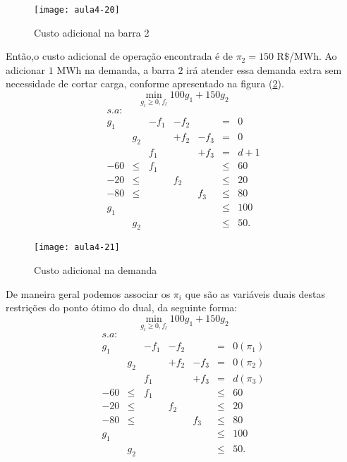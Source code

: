 \begin{figure}[H]
\begin{centering}
\texttt{[image: aula4-20]}\protect\caption{\label{fig:aula4-20} Custo adicional na barra 2}
\end{centering}
\end{figure}

Então,o custo adicional de operação encontrada é de  $\pi_{2}=150$ R$\$$/MWh.
Ao adicionar $1$ MWh na demanda, a barra $2$ irá atender essa demanda extra sem necessidade de cortar carga, conforme apresentado na figura (\ref{fig:aula4-21}).
\[
\min_{g_{i}\geq0,f_{l}}100g_{1}+150g_{2}
\]
\[
\begin{array}{ccccccc}
s.a:\\
g_{1} &  & -f_{1} & -f_{2} &  & = & 0\\
 & g_{2} &  & +f_{2} & -f_{3} & = & 0\\
 &  & f_{1} &  & +f_{3} & = & d+1\\
-60 & \leq & f_{1} &  &  & \leq & 60\\
-20 & \leq &  & f_{2} &  & \leq & 20\\
-80 & \leq &  &  & f_{3} & \leq & 80\\
g_{1} &  &  &  &  & \leq & 100\\
 & g_{2} &  &  &  & \leq & 50.
\end{array}
\]

\begin{figure}[H]
\begin{centering}
\texttt{[image: aula4-21]}\protect\caption{\label{fig:aula4-21} Custo adicional na demanda}
\end{centering}
\end{figure}

De maneira geral podemos associar os  $\pi_{i}$ que são as variáveis duais destas restrições do ponto ótimo do dual, da seguinte forma:
\[
\min_{g_{i}\geq0,f_{l}}100g_{1}+150g_{2}
\]
\[
\begin{array}{ccccccc}
s.a:\\
g_{1} &  & -f_{1} & -f_{2} &  & = & 0 (\pi_{1}) \\
 & g_{2} &  & +f_{2} & -f_{3} & = & 0 (\pi_{2})\\
 &  & f_{1} &  & +f_{3} & = & d (\pi_{3})\\
-60 & \leq & f_{1} &  &  & \leq & 60\\
-20 & \leq &  & f_{2} &  & \leq & 20\\
-80 & \leq &  &  & f_{3} & \leq & 80\\
g_{1} &  &  &  &  & \leq & 100\\
 & g_{2} &  &  &  & \leq & 50.
\end{array}
\]

